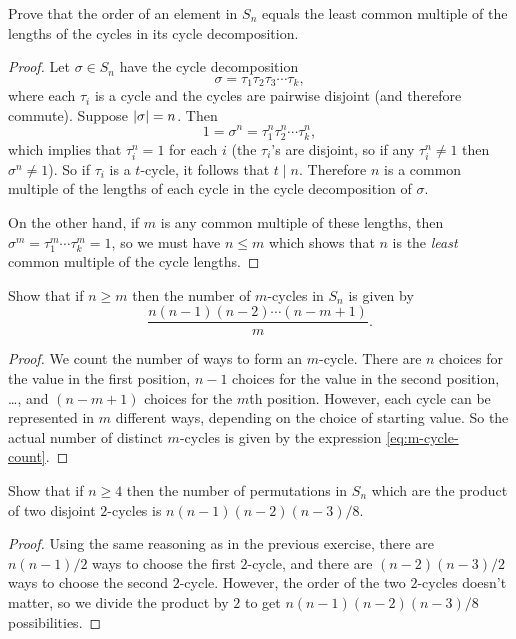  Prove that the order of an element in $S_n$ equals the
least common multiple of the lengths of the cycles in its cycle
decomposition.
\begin{proof}
  Let $\sigma\in S_n$ have the cycle decomposition
  \begin{equation*}
    \sigma = \tau_1\tau_2\tau_3\cdots\tau_k,
  \end{equation*}
  where each $\tau_i$ is a cycle and the cycles are pairwise disjoint
  (and therefore commute). Suppose $\lvert{\sigma}\rvert = n$. Then
  \begin{equation*}
    1 = \sigma^n = \tau_1^n\tau_2^n\cdots\tau_k^n,
  \end{equation*}
  which implies that $\tau_i^n = 1$ for each $i$ (the $\tau_i$'s are
  disjoint, so if any $\tau_i^n\neq1$ then $\sigma^n\neq1$). So if
  $\tau_i$ is a $t$-cycle, it follows that $t\mid n$. Therefore $n$ is
  a common multiple of the lengths of each cycle in the cycle
  decomposition of $\sigma$.

  On the other hand, if $m$ is any common multiple of these lengths,
  then $\sigma^m = \tau_1^m\cdots\tau_k^m = 1$, so we must have
  $n \leq m$ which shows that $n$ is the {\em least} common multiple
  of the cycle lengths.
\end{proof}

 Show that if $n\geq m$ then the number of $m$-cycles in
$S_n$ is given by
\begin{equation} \label{eq:m-cycle-count}
  \frac{n(n - 1)(n - 2)\cdots(n - m + 1)}m.
\end{equation}
\begin{proof}
  We count the number of ways to form an $m$-cycle. There are $n$
  choices for the value in the first position, $n-1$ choices for the
  value in the second position, \dots, and $(n - m + 1)$ choices for
  the $m$th position. However, each cycle can be represented in $m$
  different ways, depending on the choice of starting value. So the
  actual number of distinct $m$-cycles is given by the expression
  \eqref{eq:m-cycle-count}.
\end{proof}

 Show that if $n\geq4$ then the number of permutations in
$S_n$ which are the product of two disjoint $2$-cycles is
$n(n-1)(n-2)(n-3)/8$.
\begin{proof}
  Using the same reasoning as in the previous exercise, there are
  $n(n-1)/2$ ways to choose the first $2$-cycle, and there are
  $(n-2)(n-3)/2$ ways to choose the second $2$-cycle. However, the
  order of the two $2$-cycles doesn't matter, so we divide the product
  by $2$ to get $n(n-1)(n-2)(n-3)/8$ possibilities.
\end{proof}

